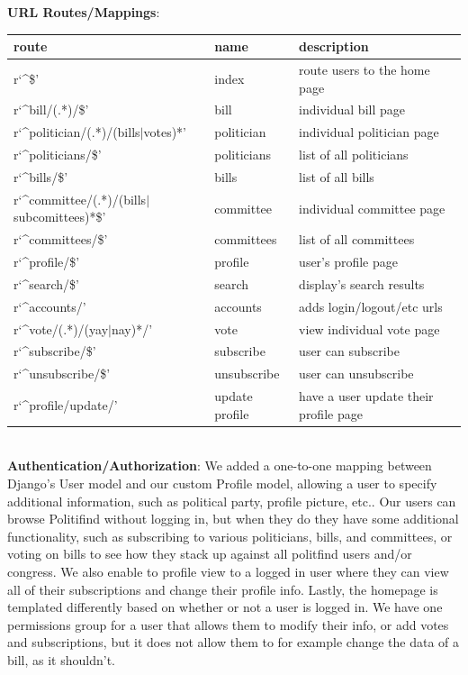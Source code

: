 \documentclass{article}
\newcommand{\n}{\noindent}
\begin{document}
\n\textbf{URL Routes/Mappings}: 
\begin{center}
\begin{tabular}{ l | l | l }
route & name & description \\
\hline
r`\^{}\$' & index & route users to the home page \\
r`\^{}bill/(.*)/\$' & bill & individual bill page\\
r`\^{}politician/(.*)/(bills$\mid$votes)*' & politician & individual politician page\\
r`\^{}politicians/\$' & politicians & list of all politicians\\
r`\^{}bills/\$' & bills & list of all bills\\
r`\^{}committee/(.*)/(bills$\mid$subcomittees)*\$' & committee & individual committee page\\
r`\^{}committees/\$' & committees & list of all committees\\
r`\^{}profile/\$' & profile & user's profile page\\
r`\^{}search/\$' & search & display's search results\\
r`\^{}accounts/' & accounts & adds login/logout/etc urls\\
r`\^{}vote/(.*)/(yay$\mid$nay)*/' & vote & view individual vote page\\
r`\^{}subscribe/\$' & subscribe & user can subscribe\\
r`\^{}unsubscribe/\$' & unsubscribe & user can unsubscribe\\
r`\^{}profile/update/' & update profile & have a user update their profile page\\
\end{tabular}
\end{center}
\\

\n\textbf{Authentication/Authorization}: We added a one-to-one mapping between Django's User model and our custom Profile model, allowing a user to specify additional information, such as political party, profile picture, etc.. Our users can browse Politifind without logging in, but when they do they have some additional functionality, such as subscribing to various politicians, bills, and committees, or voting on bills to see how they stack up against all politfind users and/or congress. We also enable to profile view to a logged in user where they can view all of their subscriptions and change their profile info. Lastly, the homepage is templated differently based on whether or not a user is logged in. We have one permissions group for a user that allows them to modify their info, or add votes and subscriptions, but it does not allow them to for example change the data of a bill, as it shouldn't. \\
\end{document}
